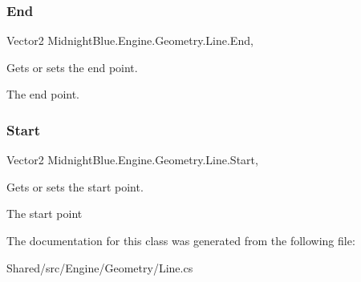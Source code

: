 \subsubsection{\texorpdfstring{End}{End}}
{\footnotesize\ttfamily Vector2 Midnight\+Blue.\+Engine.\+Geometry.\+Line.\+End\hspace{0.3cm}{\ttfamily [get]}, {\ttfamily [set]}}



Gets or sets the end point. 

The end point.\hypertarget{class_midnight_blue_1_1_engine_1_1_geometry_1_1_line_ad4ca913b1c73c20d7af64652bd3ae7fa}{}\label{class_midnight_blue_1_1_engine_1_1_geometry_1_1_line_ad4ca913b1c73c20d7af64652bd3ae7fa} 
\subsubsection{\texorpdfstring{Start}{Start}}
{\footnotesize\ttfamily Vector2 Midnight\+Blue.\+Engine.\+Geometry.\+Line.\+Start\hspace{0.3cm}{\ttfamily [get]}, {\ttfamily [set]}}



Gets or sets the start point. 

The start point

The documentation for this class was generated from the following file\+:\begin{DoxyCompactItemize}
\item 
Shared/src/\+Engine/\+Geometry/Line.\+cs\end{DoxyCompactItemize}

